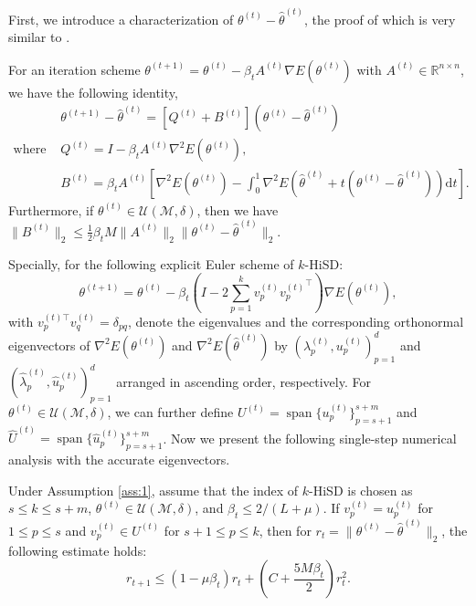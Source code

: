 \documentclass[final]{siamart251216}
\begin{document}
First, we introduce a characterization of $\theta^{(t)}-\hat{\theta}^{(t)}$, the proof of which is very similar to \cite[Lemma 3.2]{luo2022convergence}.
\begin{lemma}
\label{lemma:one_step_estimate}
For an iteration scheme 
$\theta^{(t+1)} = \theta^{(t)} - \beta_t A^{(t)}\nabla E(\theta^{(t)})$ 
with $A^{(t)}\in\mathbb{R}^{n\times n}$, we have the following identity,
\begin{equation}
\label{eqn:recursion}
\begin{aligned}
&\theta^{(t+1)}-\hat{\theta}^{(t)} = 
\left[Q^{(t)} + B^{(t)}\right] (\theta^{(t)}-\hat{\theta}^{(t)})\\
\text{where }
&Q^{(t)} = I-\beta_t  A^{(t)}\nabla^2 E(\theta^{(t)}),\\
&B^{(t)} = \beta_t A^{(t)}\left[ \nabla^2 E(\theta^{(t)})
- \int_0^1 \nabla^2 E\left(\hat{\theta}^{(t)}+t(\theta^{(t)}-\hat{\theta}^{(t)})\right) \mathrm{d}t\right].
\end{aligned}
\end{equation}
Furthermore, if $\theta^{(t)}\in \mathcal{U}(\mathcal{M,\delta})$, then we have
$\|B^{(t)}\|_2\leqslant
\frac{1}{2}\beta_tM\|A^{(t)}\|_2\|\theta^{(t)}-\hat{\theta}^{(t)}\|_2$.
\end{lemma}

Specially, for the following explicit Euler scheme of $k$-HiSD:
\begin{equation}\label{exact_position_k}
\theta^{(t+1)}=\theta^{(t)}-\beta_t
\left(I-2\sum_{p=1}^kv_p^{(t)}{v_p^{(t)}}^{\top}\right)
\nabla E(\theta^{(t)}),
\end{equation}
with ${{v_p^{(t)\top}}}{v_q^{(t)}} = \delta_{pq}$, 
denote the eigenvalues and the corresponding orthonormal eigenvectors of $\nabla^2 E(\theta^{(t)})$ and $\nabla^2 E(\hat{\theta}^{(t)})$ by $\left(\lambda_p^{(t)}, u_p^{(t)}\right)_{p=1}^d$ and $\left(\hat{\lambda}_p^{(t)}, \hat{u}_p^{(t)}\right)_{p=1}^d$ arranged in ascending order, respectively. 
For $\theta^{(t)} \in \mathcal{U}(\mathcal{M},\delta)$, we can further define $U^{(t)} = \operatorname{span}\{u_p^{(t)}\}_{p=s+1}^{s+m}$ and 
$\widehat{U}^{(t)} = \operatorname{span}\{\hat{u}_p^{(t)}\}_{p=s+1}^{s+m}$.
Now we present the following single-step numerical analysis with the accurate eigenvectors.
\begin{theorem}
\label{thm:one_step}
Under Assumption \ref{ass:1}, assume that the index of $k$-HiSD is chosen as $s\leqslant k\leqslant s+m$, $\theta^{(t)} \in \mathcal{U}(\mathcal{M},\delta)$, and $\beta_t \leqslant 2/(L+\mu)$.
If $v_p^{(t)}=u_p^{(t)}$ for $1\leqslant p\leqslant s$ 
and $v_p^{(t)} \in U^{(t)}$ for $s+1\leqslant p\leqslant k$, 
then for $r_t = \|\theta^{(t)}-\hat{\theta}^{(t)}\|_2$, the following estimate holds:
\begin{equation}\label{equ:one_step_estimate}
r_{t+1}\leqslant
\left(1-\mu\beta_t\right) r_t + \left(C 
+ \frac{5M\beta_t}{2}\right) r_t^2.
\end{equation}
\end{theorem}
\end{document}
